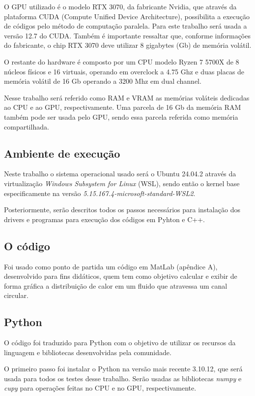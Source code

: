 \documentclass[12pt,a4paper]{article}
\begin{document}
O GPU utilizado é o modelo RTX 3070, da fabricante Nvidia, que através da plataforma CUDA (Compute Unified Device Architecture), possibilita a execução de códigos pelo método de computação paralela. Para este trabalho será usada a versão 12.7 do CUDA. Também é importante ressaltar que, conforme informações do fabricante, o chip RTX 3070 deve utilizar 8 gigabytes (Gb) de memória volátil.

O restante do hardware é composto por um CPU modelo Ryzen 7 5700X de 8 núcleos físicos e 16 virtuais, operando em overclock a 4.75 Ghz e duas placas de memória volátil de 16 Gb operando a 3200 Mhz em dual channel.

Nesse trabalho será referido como RAM e VRAM as memórias voláteis dedicadas ao CPU e ao GPU, respectivamente. Uma parcela de 16 Gb da memória RAM também pode ser usada pelo GPU, sendo essa parcela referida como memória compartilhada.

\subsection{Ambiente de execução}

Neste trabalho o sistema operacional usado será o Ubuntu 24.04.2 através da virtualização \emph{Windows Subsystem for Linux} (WSL), sendo então o kernel base especificamente na versão \emph{5.15.167.4-microsoft-standard-WSL2}.

Posteriormente, serão descritos todos os passos necessários para instalação dos drivers e programas para execução dos códigos em Pyhton e C++.

\subsection{O código}

Foi usado como ponto de partida um código em MatLab (apêndice A), desenvolvido para fins didáticos, quem tem como objetivo calcular e exibir de forma gráfica a distribuição de calor em um fluido que atravessa um canal circular.

\subsection{Python}

O código foi traduzido para Python com o objetivo de utilizar os recursos da linguagem e bibliotecas desenvolvidas pela comunidade.

O primeiro passo foi instalar o Python na versão mais recente 3.10.12, que será usada para todos os testes desse trabalho. Serão usadas as bibliotecas \emph{numpy} e \emph{cupy} para operações feitas no CPU e no GPU, respectivamente.
\end{document}
